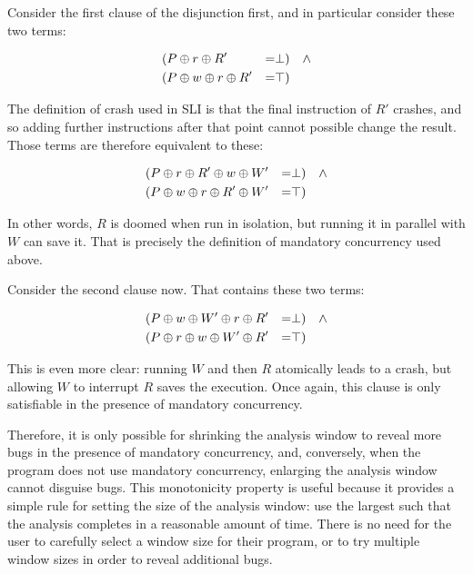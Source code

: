 Consider the first clause of the disjunction first, and in particular consider these two terms:

\begin{align*}
 & (P \oplus r \oplus R' & = & \bot) & \wedge \\
 & (P \oplus w \oplus r \oplus R' & = & \top)
\end{align*}

The definition of crash used in SLI is that the final instruction of $R'$ crashes, and so adding further instructions after that point cannot possible change the result.
Those terms are therefore equivalent to these:

\begin{align*}
 & (P \oplus r \oplus R' \oplus w \oplus W' & = & \bot) & \wedge \\
 & (P \oplus w \oplus r \oplus R' \oplus W' & = & \top)
\end{align*}

In other words, $R$ is doomed when run in isolation, but running it in parallel with $W$ can save it.
That is precisely the definition of mandatory concurrency used above.

Consider the second clause now.
That contains these two terms:

\begin{align*}
  & (P \oplus w \oplus W' \oplus r \oplus R' & = & \bot) & \wedge \\
  & (P \oplus r \oplus w \oplus W' \oplus R' & = & \top)
\end{align*}

This is even more clear: running $W$ and then $R$ atomically leads to a crash, but allowing $W$ to interrupt $R$ saves the execution.
Once again, this clause is only satisfiable in the presence of mandatory concurrency.

Therefore, it is only possible for shrinking the analysis window to reveal more bugs in the presence of mandatory concurrency, and, conversely, when the program does not use mandatory concurrency, enlarging the analysis window cannot disguise bugs.
This monotonicity property is useful because it provides a simple rule for setting the size of the analysis window: use the largest such that the analysis completes in a reasonable amount of time.
There is no need for the user to carefully select a window size for their program, or to try multiple window sizes in order to reveal additional bugs.


